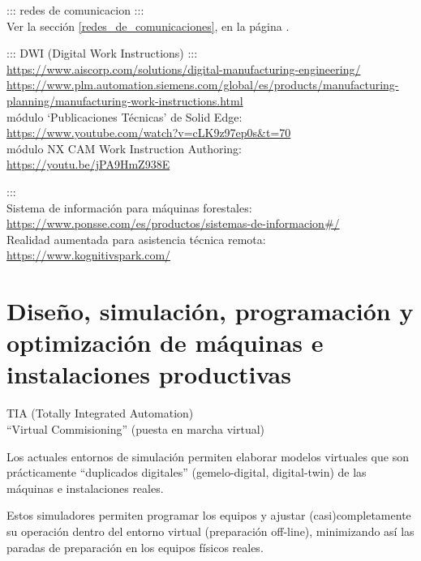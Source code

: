 \documentclass[spanish,12pt,a4paper,final,oneside]{book}
\begin{document}
::: redes de comunicacion :::
\\Ver la sección \ref{redes_de_comunicaciones}, en la página \pageref{redes_de_comunicaciones}.

::: DWI (Digital Work Instructions) :::
\\ \url{https://www.aiscorp.com/solutions/digital-manufacturing-engineering/}
\\ {\footnotesize \url{https://www.plm.automation.siemens.com/global/es/products/manufacturing-planning/manufacturing-work-instructions.html}}
\\ módulo `Publicaciones Técnicas' de Solid Edge:
\\ \url{https://www.youtube.com/watch?v=cLK9z97ep0s&t=70}
\\ módulo NX CAM Work Instruction Authoring: 
\\ \url{https://youtu.be/jPA9HmZ938E}

:::
\\ Sistema de información para máquinas forestales:
\\ \url{https://www.ponsse.com/es/productos/sistemas-de-informacion#/}
\\ Realidad aumentada para asistencia técnica remota:
\\ \url{https://www.kognitivspark.com/}


\section{Diseño, simulación, programación y optimización de máquinas e instalaciones productivas}\label{fabricacion_digital}
TIA (Totally Integrated Automation)
\\``Virtual Commisioning'' (puesta en marcha virtual) 

Los actuales entornos de simulación permiten elaborar modelos virtuales que son prácticamente ``duplicados digitales'' (gemelo-digital, digital-twin) de las máquinas e instalaciones reales. 

Estos simuladores permiten programar los equipos y ajustar (casi)completamente su operación dentro del entorno virtual (preparación off-line), minimizando así las paradas de preparación en los equipos físicos reales.
\end{document}
